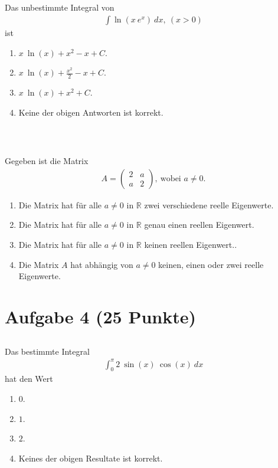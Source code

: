 \subsection*{}
Das unbestimmte Integral von
\begin{align*}
\int \ln(x \ e^x ) \ dx, \ (x > 0)
\end{align*}
ist
\renewcommand{\labelenumi}{(\alph{enumi})}
\begin{enumerate}
\item 
$ x \ \ln(x) + x^2 - x + C $.
\item
$ x \ \ln(x) + \frac{x^2}{2} - x + C $.
\item
$ x \ \ln(x) + x^2  + C $.
\item
Keine der obigen Antworten ist korrekt.
\end{enumerate}
\ \\
\subsection*{}
Gegeben ist die Matrix
\begin{align*}
A = 
\begin{pmatrix}
2 & a\\
a & 2
\end{pmatrix},
\ \textrm{wobei } a\neq 0.
\end{align*}
\renewcommand{\labelenumi}{(\alph{enumi})}
\begin{enumerate}
	\item 
	Die Matrix hat für alle $ a \neq 0 $ in $ \mathbb{R} $ zwei verschiedene reelle Eigenwerte.
	\item
	Die Matrix hat für alle $ a \neq 0 $ in $ \mathbb{R} $ genau einen reellen Eigenwert.
	
	\item
	Die Matrix hat für alle $ a \neq 0 $ in $ \mathbb{R} $ keinen reellen Eigenwert..
	\item
	Die Matrix $ A $ hat abhängig von $ a \neq 0 $ keinen, einen oder zwei reelle Eigenwerte.
\end{enumerate}


\newpage
\section*{Aufgabe 4 (25 Punkte)}
\vspace{0.4cm}

\subsection*{}
Das bestimmte Integral
\begin{align*}
\int_0^\pi 2 \ \sin(x) \ \cos(x) \ dx
\end{align*}
hat den Wert
\renewcommand{\labelenumi}{(\alph{enumi})}
\begin{enumerate}
\item 
$0$.
\item
$1$.
\item
$2$.
\item
Keines der obigen Resultate ist korrekt.
\end{enumerate}
\ \\
